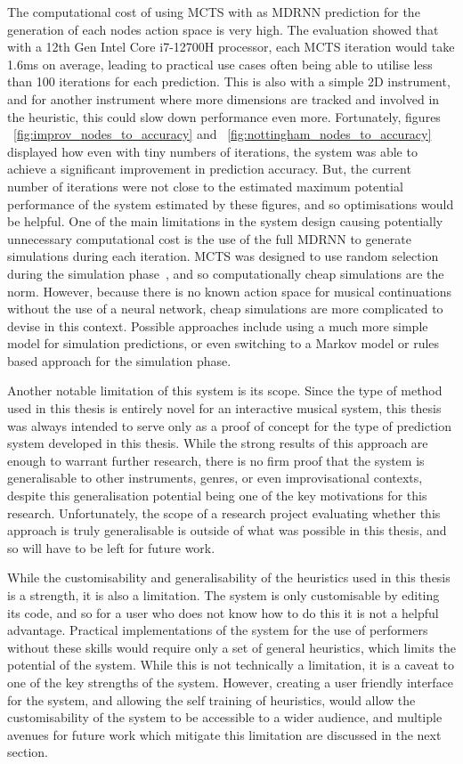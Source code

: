 The computational cost of using MCTS with as MDRNN prediction for the generation of each nodes action space is very high. The evaluation showed that with a 12th Gen Intel Core i7-12700H processor, each MCTS iteration would take 1.6ms on average, leading to practical use cases often being able to utilise less than 100 iterations for each prediction. This is also with a simple 2D instrument, and for another instrument where more dimensions are tracked and involved in the heuristic, this could slow down performance even more. Fortunately, figures ~\ref{fig:improv_nodes_to_accuracy} and ~\ref{fig:nottingham_nodes_to_accuracy} displayed how even with tiny numbers of iterations, the system was able to achieve a significant improvement in prediction accuracy. But, the current number of iterations were not close to the estimated maximum potential performance of the system estimated by these figures, and so optimisations would be helpful. One of the main limitations in the system design causing potentially unnecessary computational cost is the use of the full MDRNN to generate simulations during each iteration. MCTS was designed to use random selection during the simulation phase~\cite{Coulom2006MCTS}, and so computationally cheap simulations are the norm. However, because there is no known action space for musical continuations without the use of a neural network, cheap simulations are more complicated to devise in this context. Possible approaches include using a much more simple model for simulation predictions, or even switching to a Markov model or rules based approach for the simulation phase.

Another notable limitation of this system is its scope. Since the type of method used in this thesis is entirely novel for an interactive musical system, this thesis was always intended to serve only as a proof of concept for the type of prediction system developed in this thesis. While the strong results of this approach are enough to warrant further research, there is no firm proof that the system is generalisable to other instruments, genres, or even improvisational contexts, despite this generalisation potential being one of the key motivations for this research. Unfortunately, the scope of a research project evaluating whether this approach is truly generalisable is outside of what was possible in this thesis, and so will have to be left for future work.

While the customisability and generalisability of the heuristics used in this thesis is a strength, it is also a limitation. The system is only customisable by editing its code, and so for a user who does not know how to do this it is not a helpful advantage. Practical implementations of the system for the use of performers without these skills would require only a set of general heuristics, which limits the potential of the system. While this is not technically a limitation, it is a caveat to one of the key strengths of the system. However, creating a user friendly interface for the system, and allowing the self training of heuristics, would allow the customisability of the system to be accessible to a wider audience, and multiple avenues for future work which mitigate this limitation are discussed in the next section.

